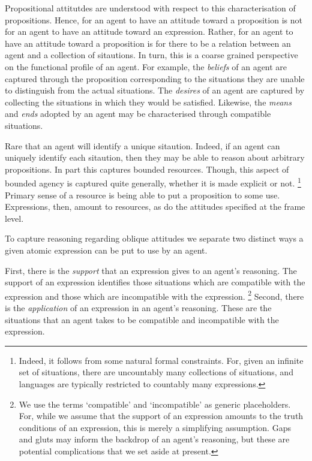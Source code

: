 \documentclass[10pt]{article}
\begin{document}
Propositional attitutdes are understood with respect to this characterisation of propositions.
Hence, for an agent to have an attitude toward a proposition is not for an agent to have an attitude toward an expression.
Rather, for an agent to have an attitude toward a proposition is for there to be a relation between an agent and a collection of sitautions.
In turn, this is a coarse grained perspective on the functional profile of an agent.
For example, the \emph{beliefs} of an agent are captured through the proposition corresponding to the situations they are unable to distinguish from the actual situations.
The \emph{desires} of an agent are captured by collecting the situations in which they would be satisfied.
Likewise, the \emph{means} and \emph{ends} adopted by an agent may be characterised through compatible situations.



Rare that an agent will identify a unique sitaution.
Indeed, if an agent can uniquely identify each sitaution, then they may be able to reason about arbitrary propositions.
In part this captures bounded resources.
Though, this aspect of bounded agency is captured quite generally, whether it is made explicit or not.\nolinebreak
\footnote{Indeed, it follows from some natural formal constraints.
  For, given an infinite set of situations, there are uncountably many collections of situations, and languages are typically restricted to countably many expressions.}
Primary sense of a resource is being able to put a proposition to some use.
Expressions, then, amount to resources, as do the attitudes specified at the frame level.

To capture reasoning regarding oblique attitudes we separate two distinct ways a given atomic expression can be put to use by an agent.

First, there is the \emph{support} that an expression gives to an agent's reasoning.
The support of an expression identifies those situations which are compatible with the expression and those which are incompatible with the expression.\nolinebreak
\footnote{We use the terms `compatible' and `incompatible' as generic placeholders.
  For, while we assume that the support of an expression amounts to the truth conditions of an expression, this is merely a simplifying assumption.
  Gaps and gluts may inform the backdrop of an agent's reasoning, but these are potential complications that we set aside at present.}
Second, there is the \emph{application} of an expression in an agent's reasoning.
These are the situations that an agent takes to be compatible and incompatible with the expression.
\end{document}
